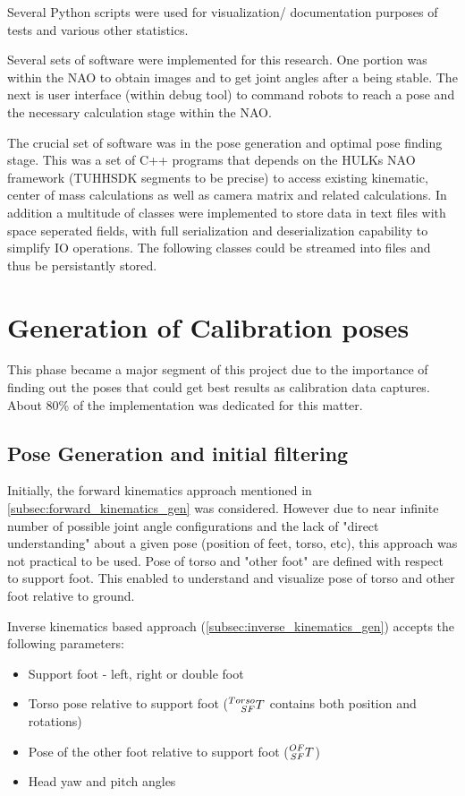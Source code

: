 \documentclass[english, printversion, nomenclature, notitle]{tuvisionthesis} %
\begin{document}
Several Python scripts were used for visualization/ documentation purposes of tests and various other statistics.


Several sets of software were implemented for this research. One portion was within the NAO to obtain images and to get joint angles after a being stable. The next is user interface (within debug tool) to command robots to reach a pose and the necessary calculation stage within the NAO.

The crucial set of software was in the pose generation and optimal pose finding stage. This was a set of C++ programs that depends on the HULKs NAO framework (TUHHSDK segments to be precise) to access existing kinematic, center of mass calculations as well as camera matrix and related calculations. In addition a multitude of classes were implemented to store data in text files with space seperated fields, with full serialization and deserialization capability to simplify IO operations. The following classes could be streamed into files and thus be persistantly stored.

\section{Generation of Calibration poses}
\label{sec:poseGen}

This phase became a major segment of this project due to the importance of finding out the poses that could get best results as calibration data captures. About 80\% of the implementation was dedicated for this matter.

\subsection{Pose Generation and initial filtering}

Initially, the forward kinematics approach mentioned in \cref{subsec:forward_kinematics_gen} was considered. However due to near infinite number of possible joint angle configurations and the lack of "direct understanding" about a given pose (position of feet, torso, etc), this approach was not practical to be used. Pose of torso and "other foot" are defined with respect to support foot. This enabled to understand and visualize pose of torso and other foot relative to ground.

Inverse kinematics based approach (\cref{subsec:inverse_kinematics_gen}) accepts the following parameters:
\begin{itemize}
	\item Support foot - left, right or double foot
	\item Torso pose relative to support foot ($\prescript{Torso}{SF}{T}$ contains both position and rotations)
	\item Pose of the other foot relative to support foot ($\prescript{OF}{SF}{T}$)
	\item Head yaw and pitch angles
\end{itemize}
\end{document}
